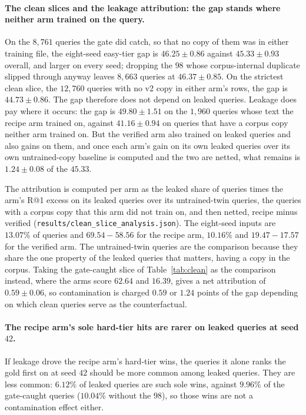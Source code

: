 \paragraph{The clean slices and the leakage attribution: the gap stands where neither arm trained on the query.}
On the $8{,}761$ queries the gate did catch, so that no copy of them was in either training file, the eight-seed easy-tier gap is $46.25 \pm 0.86$ against $45.33 \pm 0.93$ overall, and larger on every seed; dropping the $98$ whose corpus-internal duplicate slipped through anyway leaves $8{,}663$ queries at $46.37 \pm 0.85$. On the strictest clean slice, the $12{,}760$ queries with no v2 copy in either arm's rows, the gap is $44.73 \pm 0.86$. The gap therefore does not depend on leaked queries. Leakage does pay where it occurs: the gap is $49.80 \pm 1.51$ on the $1{,}960$ queries whose text the recipe arm trained on, against $41.16 \pm 0.94$ on queries that have a corpus copy neither arm trained on. But the verified arm also trained on leaked queries and also gains on them, and once each arm's gain on its own leaked queries over its own untrained-copy baseline is computed and the two are netted, what remains is $1.24 \pm 0.08$ of the $45.33$.

The attribution is computed per arm as the leaked share of queries times the arm's R@1 excess on its leaked queries over its untrained-twin queries, the queries with a corpus copy that this arm did not train on, and then netted, recipe minus verified (\texttt{results/clean\_slice\_analysis.json}). The eight-seed inputs are $13.07\%$ of queries and $69.54 - 58.56$ for the recipe arm, $10.16\%$ and $19.47 - 17.57$ for the verified arm. The untrained-twin queries are the comparison because they share the one property of the leaked queries that matters, having a copy in the corpus. Taking the gate-caught slice of Table~\ref{tab:clean} as the comparison instead, where the arms score $62.64$ and $16.39$, gives a net attribution of $0.59 \pm 0.06$, so contamination is charged $0.59$ or $1.24$ points of the gap depending on which clean queries serve as the counterfactual.

\paragraph{The recipe arm's sole hard-tier hits are rarer on leaked queries at seed $42$.}If leakage drove the recipe arm's hard-tier wins, the queries it alone ranks the gold first on at seed $42$ should be more common among leaked queries. They are less common: $6.12\%$ of leaked queries are such sole wins, against $9.96\%$ of the gate-caught queries ($10.04\%$ without the $98$), so those wins are not a contamination effect either.


